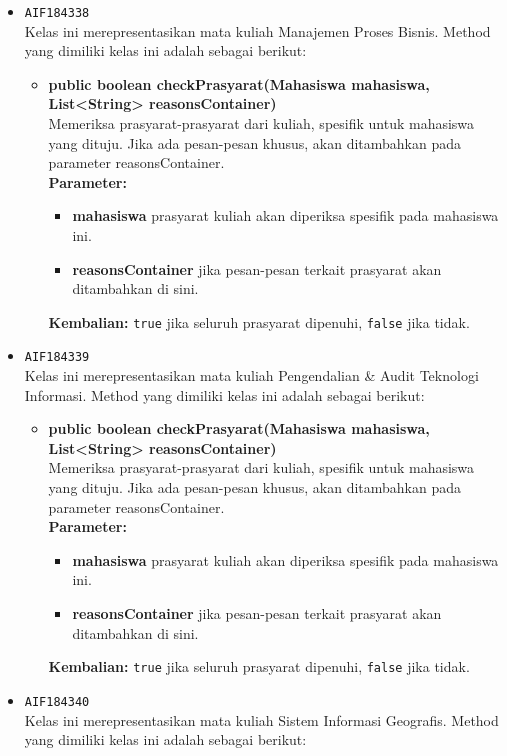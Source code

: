 \begin{enumerate}
\begin{itemize}
\item \texttt{AIF184338} \\
Kelas ini merepresentasikan mata kuliah Manajemen Proses Bisnis. Method yang dimiliki kelas ini adalah sebagai berikut: 
\begin{itemize}
\item \textbf{public boolean checkPrasyarat(Mahasiswa mahasiswa, List<String> reasonsContainer)}\\
Memeriksa prasyarat-prasyarat dari kuliah, spesifik untuk mahasiswa yang dituju. Jika ada pesan-pesan khusus, akan ditambahkan pada parameter reasonsContainer.\\
\textbf{Parameter:}
\begin{itemize}
\item \textbf{mahasiswa} prasyarat kuliah akan diperiksa spesifik pada mahasiswa ini.
\item \textbf{reasonsContainer} jika pesan-pesan terkait prasyarat akan ditambahkan di sini.
\end{itemize}
\textbf{Kembalian:} \texttt{true} jika seluruh prasyarat dipenuhi, \texttt{false} jika tidak.
\end{itemize}
\item \texttt{AIF184339} \\
Kelas ini merepresentasikan mata kuliah Pengendalian \& Audit Teknologi Informasi. Method yang dimiliki kelas ini adalah sebagai berikut: 
\begin{itemize}
\item \textbf{public boolean checkPrasyarat(Mahasiswa mahasiswa, List<String> reasonsContainer)}\\
Memeriksa prasyarat-prasyarat dari kuliah, spesifik untuk mahasiswa yang dituju. Jika ada pesan-pesan khusus, akan ditambahkan pada parameter reasonsContainer.\\
\textbf{Parameter:}
\begin{itemize}
\item \textbf{mahasiswa} prasyarat kuliah akan diperiksa spesifik pada mahasiswa ini.
\item \textbf{reasonsContainer} jika pesan-pesan terkait prasyarat akan ditambahkan di sini.
\end{itemize}
\textbf{Kembalian:} \texttt{true} jika seluruh prasyarat dipenuhi, \texttt{false} jika tidak.
\end{itemize}
\item \texttt{AIF184340} \\
Kelas ini merepresentasikan mata kuliah Sistem Informasi Geografis. Method yang dimiliki kelas ini adalah sebagai berikut: 

\end{itemize}
\end{enumerate}
